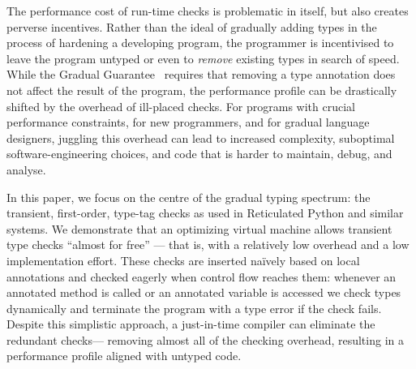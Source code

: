 The performance cost of run-time checks is problematic in itself,
but also creates perverse incentives. Rather than the ideal of
gradually adding types in the process of hardening a developing
program, the programmer is incentivised to leave the program untyped
or even to \textit{remove} existing types in search of speed.
%
While the Gradual Guarantee~\cite{XXXSiek2015} requires that
removing a type annotation does not affect the result of the
program, the performance profile can be drastically shifted by the
overhead of ill-placed checks.
%
For programs with crucial performance constraints, for new
programmers, and for gradual language designers, juggling this
overhead can lead to increased complexity, suboptimal
software-engineering choices, and code that is harder to maintain,
debug, and analyse.







In this paper, we focus on the centre of the gradual typing
spectrum: the transient, first-order, type-tag checks as used in
Reticulated Python and similar systems. We demonstrate that an
optimizing virtual machine allows transient type checks ``almost for
free'' --- that is, with a
relatively low overhead and a low implementation effort. These checks
are inserted na\"ively based on local 
annotations and checked eagerly when control flow reaches them: 
whenever an annotated method is called or
an annotated variable is accessed
we check types dynamically and
terminate the program with a type error if the check fails.
Despite this simplistic approach, a just-in-time compiler can
eliminate the redundant checks---%
removing almost all of the checking overhead,
resulting in
a performance profile aligned with untyped code.

